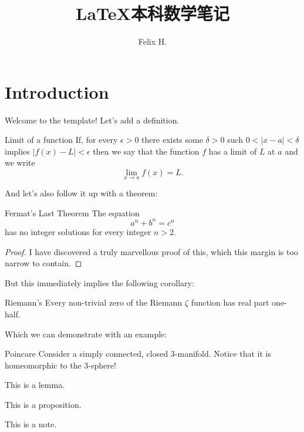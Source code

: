 \documentclass{MathNoteCN}
\title{ \LaTeX 本科数学笔记}
\author{Felix H.}
\begin{document}
	\maketitle
	\section{Introduction}
	Welcome to the template! Let's add a definition.
	\begin{definition}{Limit of a function}{}
	If, for every $ \epsilon >0 $ there exists some $ \delta >0 $ such $ 0<|x-a|<\delta $ implies $ |f(x)-L|<\epsilon $ then we say that the function $ f $ has a limit of $ L $ at $ a $ and we write
	\[\lim_{x\to a}f(x)=L.\]
	\end{definition}
	And let's also follow it up with a theorem:
	\begin{theorem}{Fermat's Last Theorem}{}
		The equation
		\[a^n+b^n=c^n\]
		has no integer solutions for every integer $ n> 2 $.
	\end{theorem}
	\begin{proof}
		I have discovered a truly marvellous proof of this, which this margin is too narrow to contain.
	\end{proof}
	But this immediately implies the following corollary:
	\begin{corollary}{Riemann's}{}
		Every non-trivial zero of the Riemann $ \zeta $ function has real part one-half.
	\end{corollary}
	Which we can demonstrate with an example:
	\begin{example}{Poincare}{}
		Consider a simply connected, closed 3-manifold. Notice that it is homeomorphic to the 3-sphere!
	\end{example}
	\begin{lemma}
		This is a lemma.
	\end{lemma}
	\begin{proposition}
		This is a proposition.
	\end{proposition}
	\begin{note}
		This is a note.
	\end{note}
		
\end{document}
